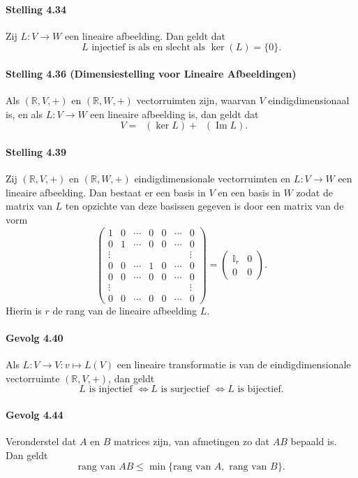 \documentclass[11pt,oneside,a4paper]{article}
\DeclareMathOperator{\rdim}{dim_\mathbb{R}}
\DeclareMathOperator{\Ima}{Im}
\begin{document}
	\paragraph{Stelling 4.34}
		Zij $L: V \to W$ een lineaire afbeelding. Dan geldt dat $$L \text{ injectief is als en slecht als } \ker(L) = \{0\}.$$
	\paragraph{Stelling 4.36 (Dimensiestelling voor Lineaire Afbeeldingen)}
		Als $(\mathbb{R}, V, +)$ en $(\mathbb{R}, W, +)$ vectorruimten zijn, waarvan $V$ eindigdimensionaal is, en als $L: V \to W$ een lineaire afbeelding is, dan geldt dat $$\rdim V = \rdim(\ker L) + \rdim(\Ima L).$$
	\paragraph{Stelling 4.39}
		Zij $(\mathbb{R}, V, +)$ en $(\mathbb{R}, W, +)$ eindigdimensionale vectorruimten en $L: V \to W$ een lineaire afbeelding. Dan bestaat er een basis in $V$ en een basis in $W$ zodat de matrix van $L$ ten opzichte van deze basissen gegeven is door een matrix van de vorm $$\begin{pmatrix}
			1 &  0 & \cdots & 0 & 0 & \cdots & 0 \\
			0 &  1 & \cdots & 0 & 0 & \cdots & 0 \\
			\vdots & & & & & & \vdots \\
			0 &  0 & \cdots & 1 & 0 & \cdots & 0 \\
			0 &  0 & \cdots & 0 & 0 & \cdots & 0 \\
			\vdots & & & & & & \vdots \\
			0 &  0 & \cdots & 0 & 0 & \cdots & 0 
		\end{pmatrix} = \begin{pmatrix}
		\mathbb{I}_r & 0 \\ 0 & 0
		\end{pmatrix}.$$
		Hierin is $r$ de rang van de lineaire afbeelding $L$.
	\paragraph{Gevolg 4.40}
		Als $L: V \to V: v \mapsto L(V)$ een lineaire transformatie is van de eindigdimensionale vectorruimte $(\mathbb{R}, V, +)$, dan geldt $$L \text{ is injectief } \Leftrightarrow L \text{ is surjectief } \Leftrightarrow L \text{ is bijectief.}$$
	\paragraph{Gevolg 4.44}
		Veronderstel dat $A$ en $B$ matrices zijn, van afmetingen zo dat $AB$ bepaald is. Dan geldt $$\text{rang van } AB \le \min\{\text{rang van } A, \text{ rang van } B\}.$$
\end{document}
